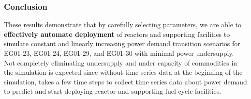 \begin{frame}
  \frametitle{Conclusion}
        These results demonstrate that by carefully selecting \deploy 
        parameters, we are able to \textbf{effectively automate deployment}
        of reactors and supporting facilities to simulate
        constant and linearly increasing power demand transition scenarios
        for EG01-23, EG01-24, EG01-29, and EG01-30 with minimal 
        power undersupply. 
        \vspace{1em}
        \\
        Not completely eliminating undersupply and under capacity of 
        commodities in the simulation is expected 
        since without time series data 
        at the beginning of the simulation, \deploy takes a few 
        time steps to collect time series data about power demand 
        to predict and start deploying reactor and supporting 
        fuel cycle facilities. 
        
\end{frame}
